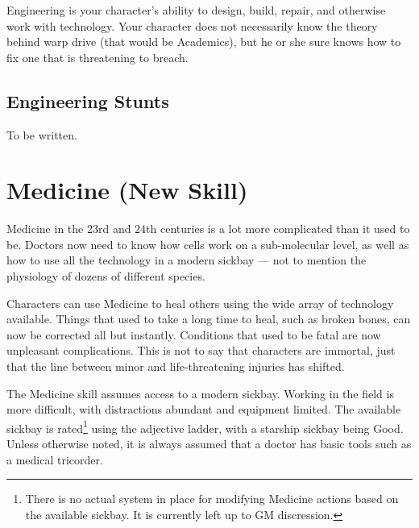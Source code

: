 \documentclass[12pt,titlepage,openany]{book}
\begin{document}
Engineering is your character's ability to design, build, repair, and otherwise
work with technology. Your character does not necessarily know the theory
behind warp drive (that would be Academics), but he or she sure knows how to
fix one that is threatening to breach.

\subsection*{Engineering Stunts}\label{subsec:engineering-stunts}

To be written.

\section{Medicine (New Skill)}\label{sec:medicine}

Medicine in the 23rd and 24th centuries is a lot more complicated than it used
to be. Doctors now need to know how cells work on a sub-molecular level, as
well as how to use all the technology in a modern sickbay --- not to mention
the physiology of dozens of different species.

Characters can use Medicine to heal others using the wide array of technology
available. Things that used to take a long time to heal, such as broken bones,
can now be corrected all but instantly. Conditions that used to be fatal are
now unpleasant complications. This is not to say that characters are immortal,
just that the line between minor and life-threatening injuries has shifted.

The Medicine skill assumes access to a modern sickbay. Working in the field is
more difficult, with distractions abundant and equipment limited. The available
sickbay is rated\footnote{There is no actual system in place for modifying
Medicine actions based on the available sickbay. It is currently left up to GM
discression.} using the adjective ladder, with a starship sickbay being Good.
Unless otherwise noted, it is always assumed that a doctor has basic tools such
as a medical tricorder.
\end{document}
